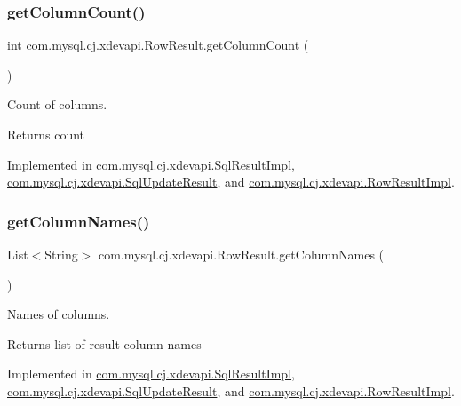\subsubsection{\texorpdfstring{get\+Column\+Count()}{getColumnCount()}}
{\footnotesize\ttfamily int com.\+mysql.\+cj.\+xdevapi.\+Row\+Result.\+get\+Column\+Count (\begin{DoxyParamCaption}{ }\end{DoxyParamCaption})}

Count of columns.

\begin{DoxyReturn}{Returns}
count 
\end{DoxyReturn}


Implemented in \mbox{\hyperlink{classcom_1_1mysql_1_1cj_1_1xdevapi_1_1_sql_result_impl_a79fa6d1b15f715dc2d451ed8ec22493f}{com.\+mysql.\+cj.\+xdevapi.\+Sql\+Result\+Impl}}, \mbox{\hyperlink{classcom_1_1mysql_1_1cj_1_1xdevapi_1_1_sql_update_result_a5b8a4cf3a36c9488feae9830562f4928}{com.\+mysql.\+cj.\+xdevapi.\+Sql\+Update\+Result}}, and \mbox{\hyperlink{classcom_1_1mysql_1_1cj_1_1xdevapi_1_1_row_result_impl_a0daf18aecc605cbeadee206dc119906f}{com.\+mysql.\+cj.\+xdevapi.\+Row\+Result\+Impl}}.

\mbox{\label{interfacecom_1_1mysql_1_1cj_1_1xdevapi_1_1_row_result_acbc412c859e4618f3b924c602a82f541}} 
\subsubsection{\texorpdfstring{get\+Column\+Names()}{getColumnNames()}}
{\footnotesize\ttfamily List$<$String$>$ com.\+mysql.\+cj.\+xdevapi.\+Row\+Result.\+get\+Column\+Names (\begin{DoxyParamCaption}{ }\end{DoxyParamCaption})}

Names of columns.

\begin{DoxyReturn}{Returns}
list of result column names 
\end{DoxyReturn}


Implemented in \mbox{\hyperlink{classcom_1_1mysql_1_1cj_1_1xdevapi_1_1_sql_result_impl_a9f539396fee9a85bbebbb39d803c9eea}{com.\+mysql.\+cj.\+xdevapi.\+Sql\+Result\+Impl}}, \mbox{\hyperlink{classcom_1_1mysql_1_1cj_1_1xdevapi_1_1_sql_update_result_a46b0f0ea62ed9ed071f14eee6a4ff743}{com.\+mysql.\+cj.\+xdevapi.\+Sql\+Update\+Result}}, and \mbox{\hyperlink{classcom_1_1mysql_1_1cj_1_1xdevapi_1_1_row_result_impl_a64fc6e525116d24a678c4538f4f072ae}{com.\+mysql.\+cj.\+xdevapi.\+Row\+Result\+Impl}}.

